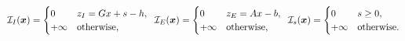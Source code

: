\documentclass{article} %
\def\gI{{\mathcal{I}}}
\newcommand{\hquad}{\hspace{0.5em}}
\begin{document}
\begin{gather*}
    \gI_I(\boldsymbol{x}) = \begin{cases}
        0       & z_I = Gx + s - h, \\
        +\infty & \text{otherwise},
    \end{cases} \hquad
    \gI_E(\boldsymbol{x}) = \begin{cases}
        0       & z_E = Ax - b, \\
        +\infty & \text{otherwise},
    \end{cases} \hquad\gI_s(\boldsymbol{x}) = \begin{cases}
        0       & s \geq 0, \\
        +\infty & \text{otherwise}.
    \end{cases}
\end{gather*}
\end{document}
